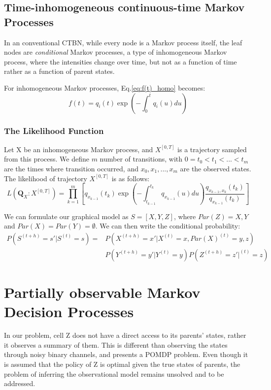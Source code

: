 \subsection{Time-inhomogeneous continuous-time Markov Processes}
In an conventional CTBN, while every node is a Markov process itself, the leaf nodes are \textit{conditional} Markov processes, a type of inhomogeneous Markov process, where the intensities change over time, but not as a function of time rather as a function of parent states. \cite{Nodelman1995} %
 
For inhomogeneous Markov processes, Eq.\ref{eq:f(t)_homo} becomes:
\begin{equation}
f(t) = q_{i}(t) \exp \left(-\int_{0}^{t} q_{i}(u) d u\right)
\end{equation}
\subsubsection{The Likelihood Function}
Let X be an inhomogeneous Markov process, and $  X^{\left[0,T\right] } $ is a trajectory sampled from this process. We define $ m $ number of transitions, with $ 0 = t_{0} < t_{1} < ... < t_{m} $ are the times where transition occurred, and $ x_{0}, x_{1},..., x_{m} $ are the observed states. The likelihood of trajectory  $  X^{\left[0,T\right] } $ is  as follows: 
\begin{equation}
L(\textbf{Q}_{X} \colon  X^{\left[0,T\right]} ) = \prod_{k=1}^{m} \left[ q_{x_{k-1}} (t_{k}) \exp \left(-\int_{t_{k-1}}^{t_{k}} q_{x_{k-1}}(u) d u\right) \frac{q_{x_{k-1}, x_{k}} (t_{k})}{q_{x_{k-1}}(t_{k})}\right] 
\label{eq:lh_traj_inhomo}
\end{equation}

We can formulate our graphical model as $ S = [X, Y, Z] $, where $ Par(Z) = {X,Y} $ and $ Par(X) = Par(Y) =\emptyset $. We can then write the conditional probability:
\begin{equation}
\begin{split}
P\left(S^{\left(t+h\right)}=s' | S^{\left(t\right)}=s\right) = & P\left(X^{\left( t+h\right) }=x' | X^{\left(t\right)}=x, Par(X)^{\left(t\right)}={y,z}\right) \\&  P\left(Y^{\left( t+h\right) }=y' | Y^{\left(t\right)}=y\right) P\left(Z^{\left( t+h\right) }=z' | ^{\left(t\right)}=z\right)
\end{split} 
\end{equation}

\section{Partially observable Markov Decision Processes}
In our problem, cell Z does not have a direct access to its parents' states, rather it observes a summary of them. This is different than observing the states through noisy binary channels, and presents a POMDP problem. Even though it is assumed that the policy of Z is optimal given the true states of parents, the problem of inferring the observational model remains unsolved and to be addressed.

